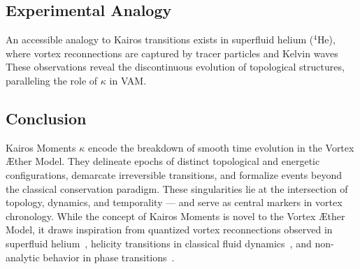 \documentclass[12pt]{article}
\begin{document}
    \subsection{Experimental Analogy}
    An accessible analogy to Kairos transitions exists in superfluid helium (\(^4\)He), where vortex reconnections are captured by tracer
    particles and Kelvin waves~\cite{bewley2006} These observations reveal the discontinuous evolution of topological structures, paralleling the role of \( \kappa \) in VAM.

    \subsection*{Conclusion}
    Kairos Moments \( \kappa \) encode the breakdown of smooth time evolution in the Vortex Æther Model. They delineate epochs of distinct
    topological and energetic configurations, demarcate irreversible transitions, and formalize events beyond the classical conservation paradigm. These singularities lie at the intersection of topology, dynamics, and temporality — and serve as central markers in vortex chronology. While the concept of Kairos Moments is novel to the Vortex Æther Model, it draws inspiration from quantized vortex reconnections observed in superfluid helium~\cite{bewley2006}, helicity transitions in classical fluid dynamics~\cite{moffatt1969}, and non-analytic behavior in phase transitions~\cite{landau1959}.







    \ifdefined\standalonechapter
    \else
    
    
    
\end{document}
